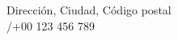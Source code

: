 {\LARGE\bfseries\sendername}\par
\vspace{-3pt}{\small\sffamily\color{accent}\senderrole}\par
\vspace{2pt}
{\small\color{muted}Dirección, Ciudad, Código postal\\
\href{mailto:\senderemail}{\senderemail}\quad /\quad +00 123 456 789}
\vspace{18pt}
